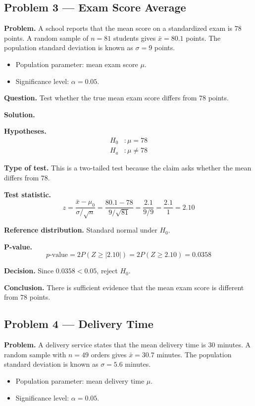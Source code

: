 \begin{ExamProblems}
\subsection*{Problem 3 — Exam Score Average}

\textbf{Problem.} A school reports that the mean score on a standardized exam is \(78\) points. A random sample of \(n=81\) students gives \(\bar{x}=80.1\) points. The population standard deviation is known as \(\sigma=9\) points.
\begin{itemize}
    \item Population parameter: mean exam score \(\mu\).
    \item Significance level: \(\alpha=0.05\).
\end{itemize}

\textbf{Question.} Test whether the true mean exam score differs from \(78\) points.

\textbf{Solution.}

\textbf{Hypotheses.}
\[
\begin{aligned}
H_0&: \mu = 78 \\
H_a&: \mu \ne 78
\end{aligned}
\]

\textbf{Type of test.} This is a two-tailed test because the claim asks whether the mean differs from \(78\).

\textbf{Test statistic.}
\[
z = \frac{\bar{x}-\mu_0}{\sigma/\sqrt{n}} = \frac{80.1-78}{9/\sqrt{81}} = \frac{2.1}{9/9} = \frac{2.1}{1} = 2.10
\]

\textbf{Reference distribution.} Standard normal under \(H_0\).

\textbf{P-value.}
\[
p\text{-value}=2P(Z\ge |2.10|)=2P(Z\ge 2.10)=0.0358
\]

\textbf{Decision.} Since \(0.0358<0.05\), reject \(H_0\).

\textbf{Conclusion.} There is sufficient evidence that the mean exam score is different from \(78\) points.

\hypertarget{c5-ex4}{}
\item
\subsection*{Problem 4 — Delivery Time}

\textbf{Problem.} A delivery service states that the mean delivery time is \(30\) minutes. A random sample with \(n=49\) orders gives \(\bar{x}=30.7\) minutes. The population standard deviation is known as \(\sigma=5.6\) minutes.
\begin{itemize}
    \item Population parameter: mean delivery time \(\mu\).
    \item Significance level: \(\alpha=0.05\).
\end{itemize}


\end{ExamProblems}
